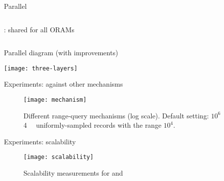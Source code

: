 \begin{frame}{Parallel \epsolute{}}
\begin{columns}[t]
\begin{column}{0.5\textwidth}
{\begin{block}{\protocolShared{}: shared \serverDS{} for all ORAMs}
					\end{block}
				}

			\end{column}


		\end{columns}


	\end{frame}

	\begin{frame}{Parallel \epsolute{} diagram (with improvements)}

		\centering
		\texttt{[image: three-layers]}

	\end{frame}

	\begin{frame}{Experiments: against other mechanisms}

		\begin{figure}[h]
			\centering
			\texttt{[image: mechanism]}
			\caption{
				\centering
				Different range-query mechanisms (log scale). \hspace{\textwidth} %
				Default setting: $10^6$ \SI{4}{\kibi\byte} uniformly-sampled records with the range $10^4$.
			}%
		\end{figure}

	\end{frame}

	\begin{frame}{Experiments: scalability}

		\begin{figure}[h]
			\centering
			\texttt{[image: scalability]}
			\caption{Scalability measurements for \protocolShared{} and \protocolSeparate{}}%
		\end{figure}

	\end{frame}
